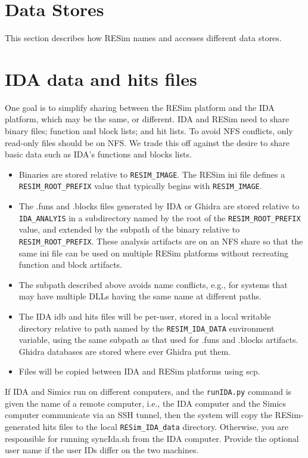 \documentclass[titlepage]{article}
\begin{document}
\section{Data Stores}
\label{data-stores}
This section describes how RESim names and accesses different data stores.

\section{IDA data and hits files}
One goal is to simplify sharing between the RESim platform and the IDA platform,
which may be the same, or different.  IDA and RESim need to share binary files; function and block lists; and hit lists.
To avoid NFS conflicts, only read-only files should be on NFS. We trade this off against
the desire to share basic data such as IDA's functions and blocks lists.  

\begin{itemize}

\item Binaries are stored relative to {\tt RESIM\_IMAGE}.  The RESim ini file defines a {\tt RESIM\_ROOT\_PREFIX} value
that typically begins with {\tt RESIM\_IMAGE}. 

\item The .funs and .blocks files generated by IDA or Ghidra are stored relative to {\tt IDA\_ANALYIS} in a subdirectory
named by the root of the {\tt RESIM\_ROOT\_PREFIX} value, and extended by the subpath of the binary relative to 
{\tt RESIM\_ROOT\_PREFIX}.  These analysis artifacts are on an NFS share so that the same ini file can be used on multiple RESim platforms
without recreating function and block artifacts.

\item The subpath described above avoids name conflicts, e.g., for systems that may have multiple DLLs having the same name at different paths.

\item The IDA idb and hits files will be per-user, stored in a local writable directory relative to path 
named by the {\tt RESIM\_IDA\_DATA} environment variable, using the same subpath as that used for .funs and .blocks artifacts.  
Ghidra databases are stored where ever Ghidra put them.

\item Files will be copied between IDA and RESim platforms using scp. 
\end{itemize}

If IDA and Simics run on different computers, and the {\tt runIDA.py} command is given the name of a remote 
computer, i.e., the IDA computer and the Simics computer communicate via an SSH tunnel, 
then the system will copy the RESim-generated hits files to the local {\tt RESim\_IDA\_data} directory.  
Otherwise, you are responsible for running syncIda.sh from the IDA computer.  Provide the optional user name
if the user IDs differ on the two machines.
\end{document}
